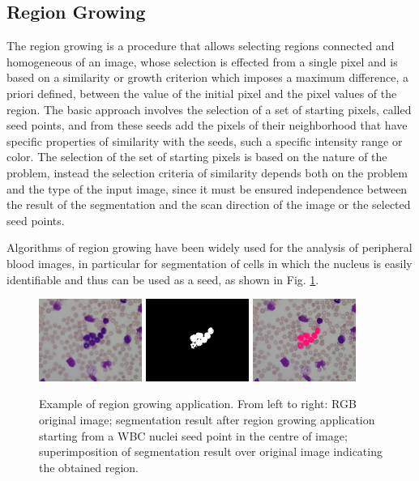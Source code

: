 \documentclass[final,a4paper,12pt,english]{UnicaPhdThesis3}
\begin{document}
\subsection{Region Growing} 
The region growing is a procedure that allows selecting regions connected and homogeneous of an image, whose selection is effected from a single pixel and is based on a similarity or growth criterion which imposes a maximum difference, a priori defined, between the value of the initial pixel and the pixel values ​​of the region. The basic approach involves the selection of a set of starting pixels, called seed points, and from these seeds add the pixels of their neighborhood that have specific properties of similarity with the seeds, such a specific intensity range or color. The selection of the set of starting pixels is based on the nature of the problem, instead the selection criteria of similarity depends both on the problem and the type of the input image, since it must be ensured independence between the result of the segmentation and the scan direction of the image or the selected seed points. 

Algorithms of region growing have been widely used for the analysis of peripheral blood images, in particular for segmentation of cells in which the nucleus is easily identifiable and thus can be used as a seed, as shown in Fig. \ref{fig:regionGrowing}. 

\begin{figure}[h]
	\centering
	\includegraphics[width=0.3\textwidth]{images/figcs_rgb}
	\includegraphics[width=0.3\textwidth]{images/fig_regionGrowing}
	\includegraphics[width=0.3\textwidth]{images/fig_regionGrowing2}
	\caption{\label{fig:regionGrowing}Example of region growing application. From left to right: RGB original image; segmentation result after region growing application starting from a WBC nuclei seed point in the centre of image; superimposition of segmentation result over original image indicating the obtained region.}
\end{figure}
\end{document}

